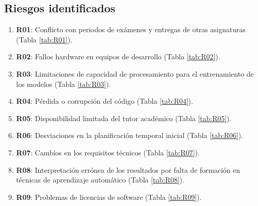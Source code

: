 \subsection*{Riesgos identificados}
\begin{enumerate}
    \item \textbf{R01}: Conflicto con periodos de exámenes y entregas de otras asignaturas (Tabla \ref{tab:R01}).
    \item \textbf{R02}: Fallos hardware en equipos de desarrollo (Tabla \ref{tab:R02}).
    \item \textbf{R03}: Limitaciones de capacidad de procesamiento para el entrenamiento de los modelos (Tabla \ref{tab:R03}).
    \item \textbf{R04}: Pérdida o corrupción del código (Tabla \ref{tab:R04}).
    \item \textbf{R05}: Disponibilidad limitada del tutor académico (Tabla \ref{tab:R05}).
    \item \textbf{R06}: Desviaciones en la planificación temporal inicial (Tabla \ref{tab:R06}).
    \item \textbf{R07}: Cambios en los requisitos técnicos (Tabla \ref{tab:R07}).
    \item \textbf{R08}: Interpretación errónea de los resultados por falta de formación en técnicas de aprendizaje automático (Tabla \ref{tab:R08}).
    \item \textbf{R09}: Problemas de licencias de software (Tabla \ref{tab:R09}).
\end{enumerate}

